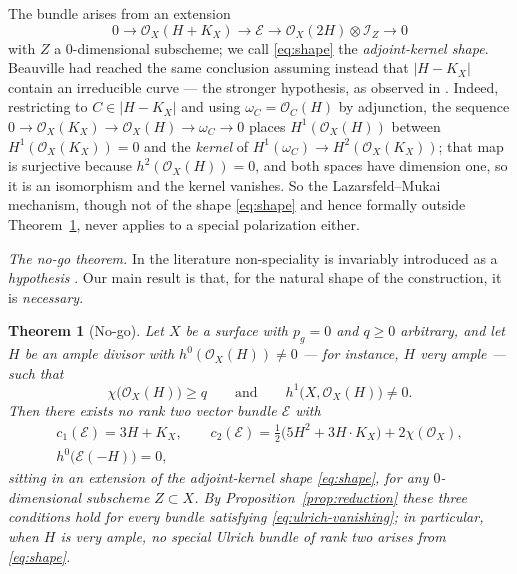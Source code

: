\documentclass[10pt,a4paper]{amsart}
\newtheorem{theorem}{Theorem}[section]
\newcommand{\OO}{\mathcal{O}}
\newcommand{\EE}{\mathcal{E}}
\newcommand{\II}{\mathcal{I}}
\begin{document}
The bundle arises from an extension
\begin{equation}\label{eq:shape}
0\longrightarrow\OO_X(H+K_X)\longrightarrow\EE\longrightarrow\OO_X(2H)\otimes\II_Z\longrightarrow 0
\end{equation}
with $Z$ a $0$-dimensional subscheme; we call \eqref{eq:shape} the \emph{adjoint-kernel shape}. Beauville \cite{Bea16b} had reached the same conclusion assuming instead that $|H-K_X|$ contain an irreducible curve --- the stronger hypothesis, as observed in \cite[Rem.~3.5]{Cas17}. Indeed, restricting to $C\in|H-K_X|$ and using $\omega_C=\OO_C(H)$ by adjunction, the sequence $0\to\OO_X(K_X)\to\OO_X(H)\to\omega_C\to0$ places $H^1(\OO_X(H))$ between $H^1(\OO_X(K_X))=0$ and the \emph{kernel} of $H^1(\omega_C)\to H^2(\OO_X(K_X))$; that map is surjective because $h^2(\OO_X(H))=0$, and both spaces have dimension one, so it is an isomorphism and the kernel vanishes. So the Lazarsfeld--Mukai mechanism, though not of the shape \eqref{eq:shape} and hence formally outside Theorem~\ref{thm:nogo}, never applies to a special polarization either.

\smallskip
\noindent\emph{The no-go theorem.} In the literature non-speciality is invariably introduced as a \emph{hypothesis} \cite{Bea16b,Cas17,Cas22,Cas19}. Our main result is that, for the natural shape of the construction, it is \emph{necessary}.


\begin{theorem}[No-go]\label{thm:nogo}
Let $X$ be a surface with $p_g=0$ and $q\ge0$ arbitrary, and let $H$ be an ample divisor with $h^0(\OO_X(H))\neq0$ --- for instance, $H$ very ample --- such that
\[
\chi\bigl(\OO_X(H)\bigr)\ge q\qquad\text{and}\qquad h^1\bigl(X,\OO_X(H)\bigr)\neq0 .
\]
Then there exists \emph{no} rank two vector bundle $\EE$ with
\begin{gather*}
c_1(\EE)=3H+K_X,\qquad c_2(\EE)=\tfrac12\bigl(5H^2+3H\cdot K_X\bigr)+2\chi(\OO_X),\\
h^0\bigl(\EE(-H)\bigr)=0,
\end{gather*}
sitting in an extension of the adjoint-kernel shape \eqref{eq:shape}, for any $0$-dimensional subscheme $Z\subset X$. By Proposition~\ref{prop:reduction} these three conditions hold for every bundle satisfying \eqref{eq:ulrich-vanishing}; in particular, when $H$ is very ample, no special Ulrich bundle of rank two arises from \eqref{eq:shape}.
\end{theorem}
\end{document}
